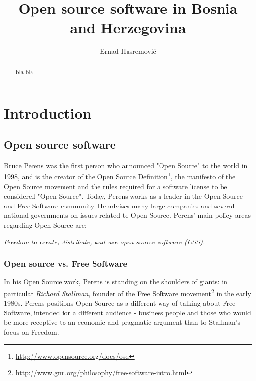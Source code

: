 \documentclass[times, utf8, seminar]{fit}
\begin{document}
\title{Open source software in Bosnia and Herzegovina}

\author{Ernad Husremović}


\maketitle

\tableofcontents

\listoftables
\listoffigures

\begin{abstract}

bla bla 

\end{abstract}


\chapter{Introduction}

\section{Open source software}

Bruce Perens was the first person who announced "Open Source" to the world in 1998, and is the creator of the Open Source Definition\footnote{\url{http://www.opensource.org/docs/osd}}, the manifesto of the Open Source movement and the rules required for a software license to be considered "Open Source"\citep{web:perens}. Today, Perens works as a leader in the Open Source and Free Software community. He advises many large companies and several national governments on issues related to Open Source. Perens' main policy areas regarding Open Source are:

\begin{center}
\emph{\large{Freedom to create, distribute, and use open source software (OSS).}}
\end{center}


\subsection{Open source vs. Free Software}

In his Open Source work, Perens is standing on the shoulders of giants: in particular \emph{Richard Stallman}, founder of the Free Software movement\footnote{\url{http://www.gnu.org/philosophy/free-software-intro.html}} in the early 1980s. Perens positions Open Source as a different way of talking about Free Software, intended for a different audience - business people and those who would be more receptive to an economic and pragmatic argument than to Stallman's focus on Freedom\citep{web:perens}.
\end{document}
